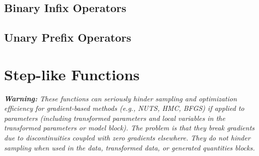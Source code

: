 \subsection{Binary Infix Operators}

\begin{description}
\end{description}

\subsection{Unary Prefix Operators}

\begin{description}
\end{description}


\section{Step-like Functions}\label{step-functions.section}

{\it {\bf Warning:} These functions can seriously hinder sampling and
  optimization efficiency for gradient-based methods (e.g., NUTS, HMC,
  BFGS) if applied to parameters (including transformed parameters and
  local variables in the transformed parameters or model block).  The
  problem is that they break gradients due to discontinuities coupled with
  zero gradients elsewhere.  They do not hinder sampling when used in the
  data, transformed data, or generated quantities blocks.}

